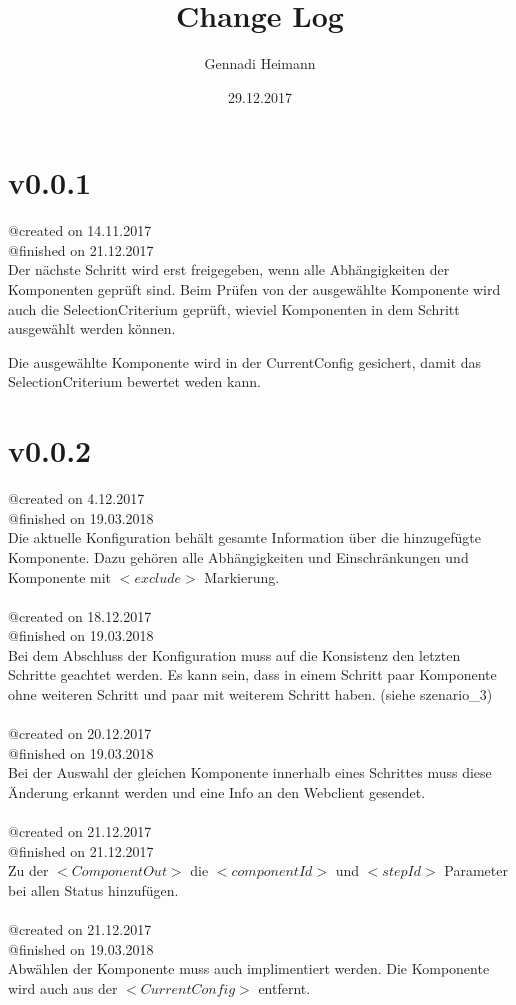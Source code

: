 \documentclass{article}
\begin{document}
\begin{titlepage}
\author{Gennadi Heimann} 
\title{Change Log} 
\date{29.12.2017} 
\maketitle
\end{titlepage}

\section{v0.0.1}
@created on     14.11.2017\\
@finished on   21.12.2017\\

Der nächste Schritt wird erst freigegeben, wenn alle Abhängigkeiten 
der Komponenten geprüft sind. Beim Prüfen von der ausgewählte 
Komponente wird auch die SelectionCriterium geprüft, wieviel Komponenten 
in dem Schritt ausgewählt werden können.

Die ausgewählte Komponente wird in der CurrentConfig gesichert, damit das
SelectionCriterium bewertet weden kann.\\

\section{v0.0.2}

@created on     4.12.2017\\
@finished on   19.03.2018\\
Die aktuelle Konfiguration behält gesamte Information über die hinzugefügte
Komponente. Dazu gehören alle Abhängigkeiten und Einschränkungen und
Komponente mit $<exclude>$ Markierung.\\
\\
@created on 18.12.2017\\
@finished on 19.03.2018\\
Bei dem Abschluss der Konfiguration muss auf die Konsistenz den letzten
Schritte geachtet werden. Es kann sein, dass in einem Schritt paar Komponente
ohne weiteren Schritt und paar mit weiterem Schritt haben. (siehe
szenario\_3)\\
\\
@created on 20.12.2017\\
@finished on 19.03.2018\\
Bei der Auswahl der gleichen Komponente innerhalb eines Schrittes muss 
diese Änderung erkannt werden und eine Info an den Webclient gesendet.\\
\\
@created on 21.12.2017\\
@finished on 21.12.2017\\
Zu der $<ComponentOut>$ die $<componentId>$ und $<stepId>$ Parameter bei
allen Status hinzuf\"ugen.\\
\\
@created on 21.12.2017\\
@finished on 19.03.2018\\
Abw\"ahlen der Komponente muss auch implimentiert werden. Die Komponente wird
auch aus der $<CurrentConfig>$ entfernt.\\
\\
\end{document}
